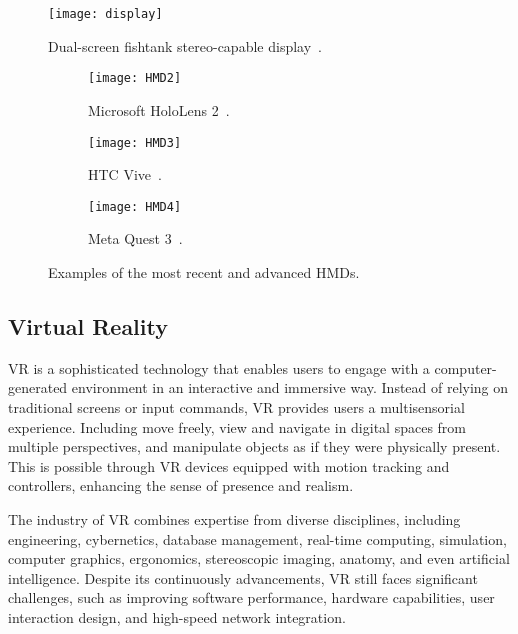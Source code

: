 \begin{figure}[h!]
    \centering
    \texttt{[image: display]}
    \caption{Dual-screen fishtank stereo-capable display~\cite{SHERMAN2019258}.} 
    \label{fig:display}
\end{figure}

\begin{figure}[h!]
    \centering
    \begin{subfigure}[b]{0.3\textwidth}
        \centering
        \texttt{[image: HMD2]}
        \caption{Microsoft HoloLens 2~\cite{headset_article}.}
        \label{fig:HM}
    \end{subfigure}
    \begin{subfigure}[b]{0.3\textwidth}
        \centering
        \texttt{[image: HMD3]}
        \caption{HTC Vive~\cite{SHERMAN2019258}.}
        \label{fig:y1}
    \end{subfigure}
    \hfill
    \begin{subfigure}[b]{0.3\textwidth}
        \centering
        \texttt{[image: HMD4]}
        \caption{Meta Quest 3~\cite{article}.}
        \label{fig:y2}
    \end{subfigure}
    \caption{Examples of the most recent and advanced \glspl{HMD}.}
    \label{fig:HMDs}
\end{figure}

\FloatBarrier

\subsection{Virtual Reality}
\label{sec:virtual_reality}

\gls{VR} is a sophisticated technology that enables users to engage with a computer-generated environment in an interactive and immersive way. Instead of relying on traditional screens or input commands, \gls{VR} provides users a multisensorial experience. Including move freely, view and navigate in digital spaces from multiple perspectives, and manipulate objects as if they were physically present. This is possible through \gls{VR} devices equipped with motion tracking and controllers, enhancing the sense of presence and realism.

The industry of \gls{VR} combines expertise from diverse disciplines, including engineering, cybernetics, database management, real-time computing, simulation, computer graphics, ergonomics, stereoscopic imaging, anatomy, and even artificial intelligence. Despite its continuously advancements, \gls{VR} still faces significant challenges, such as improving software performance, hardware capabilities, user interaction design, and high-speed network integration.

